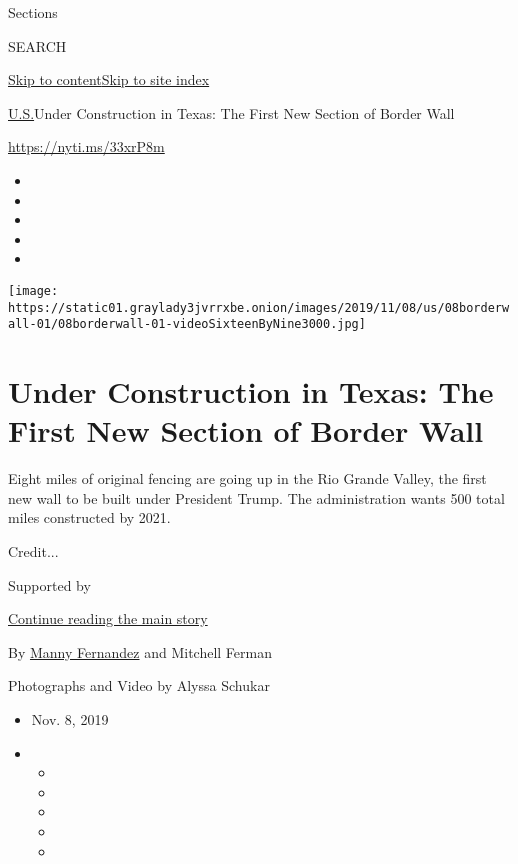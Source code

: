 Sections

SEARCH

\protect\hyperlink{site-content}{Skip to
content}\protect\hyperlink{site-index}{Skip to site index}

\href{/section/us}{U.S.}\textbar{}Under Construction in Texas: The First
New Section of Border Wall

\url{https://nyti.ms/33xrP8m}

\begin{itemize}
\item
\item
\item
\item
\item
\end{itemize}

\texttt{[image: https://static01.graylady3jvrrxbe.onion/images/2019/11/08/us/08borderwall-01/08borderwall-01-videoSixteenByNine3000.jpg]}

\hypertarget{under-construction-in-texas-the-first-new-section-of-border-wall}{%
\section{Under Construction in Texas: The First New Section of Border
Wall}\label{under-construction-in-texas-the-first-new-section-of-border-wall}}

Eight miles of original fencing are going up in the Rio Grande Valley,
the first new wall to be built under President Trump. The administration
wants 500 total miles constructed by 2021.

Credit...

Supported by

\protect\hyperlink{after-sponsor}{Continue reading the main story}

By \href{https://www.nytimes3xbfgragh.onion/by/manny-fernandez}{Manny
Fernandez} and Mitchell Ferman

Photographs and Video by Alyssa Schukar

\begin{itemize}
\item
  Nov. 8, 2019
\item
  \begin{itemize}
  \item
  \item
  \item
  \item
  \item
  \end{itemize}
\end{itemize}

